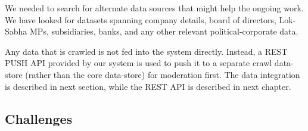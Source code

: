 We needed to search for alternate data sources that might help the ongoing work. We have looked for datasets spanning company details, board of directors, Lok-Sabha MPs, subsidiaries, banks, and any other relevant political-corporate data. 

Any data that is crawled is not fed into the system directly. Instead, a REST PUSH API provided by our system is used to push it to a separate crawl data-store (rather than the core data-store) for moderation first. The  data integration is described in next section, while the REST API is described in next chapter. 

\subsection{Challenges}

